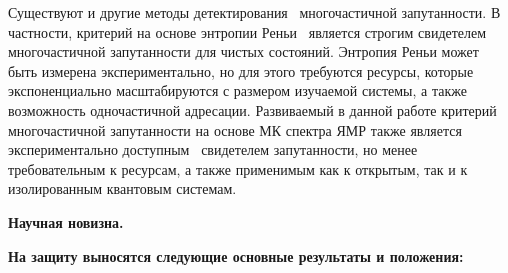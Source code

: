 Существуют и другие методы детектирования~\cite{Guhne2009} многочастичной запутанности.
В частности, критерий на основе энтропии Реньи~\cite{Hosur2016, Fan2017}
является строгим свидетелем многочастичной запутанности для чистых состояний.
Энтропия Реньи может быть измерена экспериментально,
но для этого требуются ресурсы,
которые экспоненциально масштабируются с размером изучаемой системы,
а также возможность одночастичной адресации.
Развиваемый в данной работе критерий многочастичной запутанности на основе МК спектра ЯМР
также является экспериментально доступным~\cite{Baum1985} свидетелем запутанности,
но менее требовательным к ресурсам,
а также применимым как к открытым,
так и к изолированным квантовым системам.





\textbf{Научная новизна.}


\textbf{На защиту выносятся следующие основные результаты и положения:}



